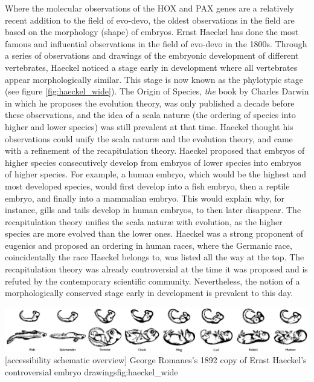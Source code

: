 Where the molecular observations of the HOX and PAX genes are a relatively recent addition to the field of evo-devo, the oldest observations in the field are based on the morphology (shape) of embryos. Ernst Haeckel has done the most famous and influential observations in the field of evo-devo in the 1800s\cite{haeckel1866}. Through a series of observations and drawings of the embryonic development of different vertebrates, Haeckel noticed a stage early in development where all vertebrates appear morphologically similar. This stage is now known as the phylotypic stage (see figure \ref{fig:haeckel_wide}). The Origin of Species, \textit{the} book by Charles Darwin in which he proposes the evolution theory, was only published a decade before these observations, and the idea of a scala naturæ (the ordering of species into higher and lower species) was still prevalent at that time. Haeckel thought his observations could unify the scala naturæ and the evolution theory, and came with a refinement of the recapitulation theory. Haeckel proposed that embryos of higher species consecutively develop from embryos of lower species into embryos of higher species. For example, a human embryo, which would be the highest and most developed species, would first develop into a fish embryo, then a reptile embryo, and finally into a mammalian embryo. This would explain why, for instance, gills and tails develop in human embryos, to then later disappear. The recapitulation theory unifies the scala naturæ with evolution, as the higher species are more evolved than the lower ones. Haeckel was a strong proponent of eugenics and proposed an ordering in human races, where the Germanic race, coincidentally the race Haeckel belongs to, was listed all the way at the top\cite{Levit2020}. The recapitulation theory was already controversial at the time it was proposed and is refuted by the contemporary scientific community. Nevertheless, the notion of a morphologically conserved stage early in development is prevalent to this day.

{\includegraphics[width=2.2\textwidth]
{ch.introduction/imgs/haeckel_wide.png}}
[accessibility schematic overview]
{George Romanes's 1892 copy of Ernst Haeckel's controversial embryo drawings}{fig:haeckel_wide}

